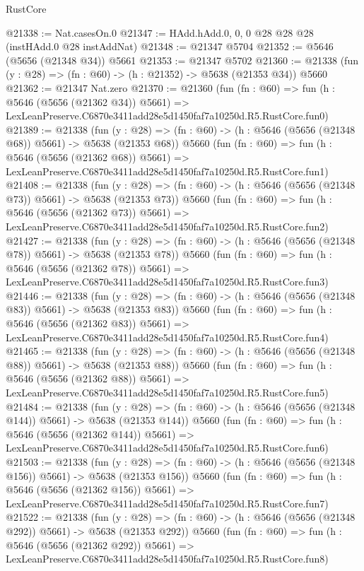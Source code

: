 \begin{lexlean}{RustCore}
\begin{coremodule}
@21338 := Nat.casesOn.{0}
@21347 := HAdd.hAdd.{0, 0, 0} @28 @28 @28 (instHAdd.{0} @28 instAddNat)
@21348 := @21347 @5704
@21352 := @5646 (@5656 (@21348 @34)) @5661
@21353 := @21347 @5702
@21360 := @21338 (fun (y : @28) => (fn : @60) -> (h : @21352) -> @5638 (@21353 @34)) @5660
@21362 := @21347 Nat.zero
@21370 := @21360
    (fun (fn : @60) =>
    fun (h : @5646 (@5656 (@21362 @34)) @5661) =>
    LexLeanPreserve.C6870e3411add28e5d1450faf7a10250d.R5.RustCore.fun0)
@21389 := @21338
    (fun (y : @28) => (fn : @60) -> (h : @5646 (@5656 (@21348 @68)) @5661) -> @5638 (@21353 @68))
    @5660
    (fun (fn : @60) =>
    fun (h : @5646 (@5656 (@21362 @68)) @5661) =>
    LexLeanPreserve.C6870e3411add28e5d1450faf7a10250d.R5.RustCore.fun1)
@21408 := @21338
    (fun (y : @28) => (fn : @60) -> (h : @5646 (@5656 (@21348 @73)) @5661) -> @5638 (@21353 @73))
    @5660
    (fun (fn : @60) =>
    fun (h : @5646 (@5656 (@21362 @73)) @5661) =>
    LexLeanPreserve.C6870e3411add28e5d1450faf7a10250d.R5.RustCore.fun2)
@21427 := @21338
    (fun (y : @28) => (fn : @60) -> (h : @5646 (@5656 (@21348 @78)) @5661) -> @5638 (@21353 @78))
    @5660
    (fun (fn : @60) =>
    fun (h : @5646 (@5656 (@21362 @78)) @5661) =>
    LexLeanPreserve.C6870e3411add28e5d1450faf7a10250d.R5.RustCore.fun3)
@21446 := @21338
    (fun (y : @28) => (fn : @60) -> (h : @5646 (@5656 (@21348 @83)) @5661) -> @5638 (@21353 @83))
    @5660
    (fun (fn : @60) =>
    fun (h : @5646 (@5656 (@21362 @83)) @5661) =>
    LexLeanPreserve.C6870e3411add28e5d1450faf7a10250d.R5.RustCore.fun4)
@21465 := @21338
    (fun (y : @28) => (fn : @60) -> (h : @5646 (@5656 (@21348 @88)) @5661) -> @5638 (@21353 @88))
    @5660
    (fun (fn : @60) =>
    fun (h : @5646 (@5656 (@21362 @88)) @5661) =>
    LexLeanPreserve.C6870e3411add28e5d1450faf7a10250d.R5.RustCore.fun5)
@21484 := @21338
    (fun (y : @28) => (fn : @60) -> (h : @5646 (@5656 (@21348 @144)) @5661) -> @5638 (@21353 @144))
    @5660
    (fun (fn : @60) =>
    fun (h : @5646 (@5656 (@21362 @144)) @5661) =>
    LexLeanPreserve.C6870e3411add28e5d1450faf7a10250d.R5.RustCore.fun6)
@21503 := @21338
    (fun (y : @28) => (fn : @60) -> (h : @5646 (@5656 (@21348 @156)) @5661) -> @5638 (@21353 @156))
    @5660
    (fun (fn : @60) =>
    fun (h : @5646 (@5656 (@21362 @156)) @5661) =>
    LexLeanPreserve.C6870e3411add28e5d1450faf7a10250d.R5.RustCore.fun7)
@21522 := @21338
    (fun (y : @28) => (fn : @60) -> (h : @5646 (@5656 (@21348 @292)) @5661) -> @5638 (@21353 @292))
    @5660
    (fun (fn : @60) =>
    fun (h : @5646 (@5656 (@21362 @292)) @5661) =>
    LexLeanPreserve.C6870e3411add28e5d1450faf7a10250d.R5.RustCore.fun8)

\end{coremodule}
\end{lexlean}
